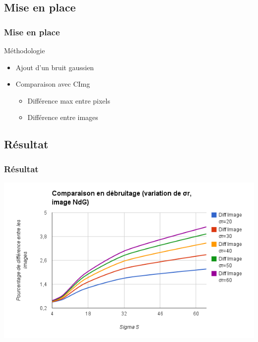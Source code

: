 \documentclass[compress]{beamer}
\begin{document}
\subsection{Mise en place}
\begin{frame}\frametitle{Mise en place}
	\begin{block}{Méthodologie}
		\begin{itemize}
			\item Ajout d'un bruit gaussien
			\item Comparaison avec CImg
				\begin{itemize}
					\item Différence max entre pixels
					\item Différence entre images
				\end{itemize}
		\end{itemize}
	
	\end{block}
\end{frame}

\subsection{Résultat}
\begin{frame}\frametitle{Résultat}

	\centering
	\includegraphics[scale=0.5]{images/debruitageNdGSigmaRDiffImage.png}

\end{frame}
\end{document}
